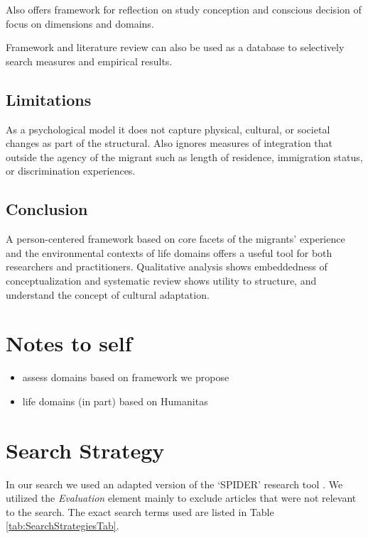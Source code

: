 \documentclass[man, 12pt, a4paper]{apa7}
\begin{document}
Also offers framework for reflection on study conception and conscious decision of focus on dimensions and domains.

Framework and literature review can also be used as a database to selectively search measures and empirical results.
\subsection{Limitations}
As a psychological model it does not capture physical, cultural, or societal changes as part of the structural. Also ignores measures of integration that outside the agency of the migrant such as length of residence, immigration status, or discrimination experiences.

\subsection{Conclusion}
A person-centered framework based on core facets of the migrants’ experience and the environmental contexts of life domains offers a useful tool for both researchers and practitioners. Qualitative analysis shows embeddedness of conceptualization and systematic review shows utility to structure, and understand the concept of cultural adaptation.

\section{Notes to self}
\begin{itemize}
  \item assess domains based on framework we propose
  \item life domains (in part) based on Humanitas
\end{itemize}

\printbibliography

\appendix

\section{Search Strategy}
\label{app:AppendixSearchStrategy}

In our search we used an adapted version of the `SPIDER' research tool \citep[e.g.,][]{Cooke2012}. We utilized the \textit{Evaluation} element mainly to exclude articles that were not relevant to the search. The exact search terms used are listed in Table \ref{tab:SearchStrategiesTab}.



\end{document}
